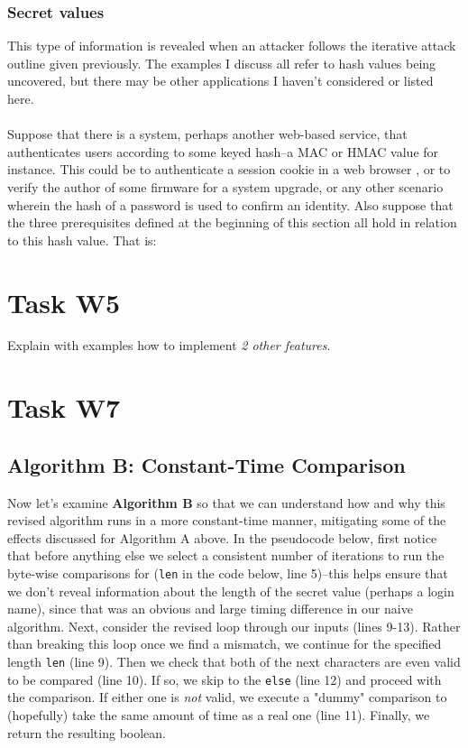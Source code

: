 \documentclass{article}
\providecommand{\inlinecode}{\texttt}
\begin{document}
\subsubsection{Secret values}
This type of information is revealed when an attacker follows the iterative attack outline given previously. The examples I discuss all refer to hash values being uncovered, but there may be other applications I haven't considered or listed here. \\
  \\
  Suppose that there is a system, perhaps another web-based service, that authenticates users according to some keyed hash--a MAC or HMAC value for instance. This could be to authenticate a session cookie in a web browser \cite{codahale}, or to verify the author of some firmware for a system upgrade, or any other scenario wherein the hash of a password is used to confirm an identity. Also suppose that the three prerequisites defined at the beginning of this section all hold in relation to this hash value. That is:



\section{Task W5}
Explain with examples how to implement \textit{2 other features}.



\pagebreak

\section{Task W7}
\subsection{Algorithm B: Constant-Time Comparison}
Now let's examine \textbf{Algorithm B} so that we can understand how and why this revised algorithm runs in a more constant-time manner, mitigating some of the effects discussed for Algorithm A above.
In the pseudocode below, first notice that before anything else we select a consistent number of iterations to run the byte-wise comparisons for (\inlinecode{len} in the code below, line 5)--this helps ensure that we don't reveal information about the length of the secret value (perhaps a login name), since that was an obvious and large timing difference in our naive algorithm.
Next, consider the revised loop through our inputs (lines 9-13). Rather than breaking this loop once we find a mismatch, we continue for the specified length \inlinecode{len} (line 9).
Then we check that both of the next characters are even valid to be compared (line 10). If so, we skip to the \inlinecode{else} (line 12) and proceed with the comparison. If either one is \textit{not} valid, we execute a "dummy" comparison to (hopefully) take the same amount of time as a real one (line 11).
Finally, we return the resulting boolean.
\end{document}
